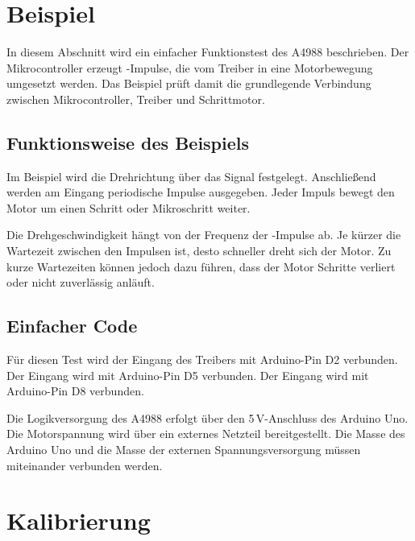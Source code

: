 \section{Beispiel}

In diesem Abschnitt wird ein einfacher Funktionstest des A4988 beschrieben. 
Der Mikrocontroller erzeugt -Impulse, die vom Treiber in eine Motorbewegung umgesetzt werden. 
Das Beispiel prüft damit die grundlegende Verbindung zwischen Mikrocontroller, Treiber und Schrittmotor.

\subsection{Funktionsweise des Beispiels}

Im Beispiel wird die Drehrichtung über das Signal  festgelegt. 
Anschließend werden am Eingang  periodische Impulse ausgegeben. 
Jeder Impuls bewegt den Motor um einen Schritt oder Mikroschritt weiter.

Die Drehgeschwindigkeit hängt von der Frequenz der -Impulse ab. 
Je kürzer die Wartezeit zwischen den Impulsen ist, desto schneller dreht sich der Motor. 
Zu kurze Wartezeiten können jedoch dazu führen, dass der Motor Schritte verliert oder nicht zuverlässig anläuft.

\subsection{Einfacher Code}

Für diesen Test wird der Eingang  des Treibers mit Arduino-Pin D2 verbunden. 
Der Eingang  wird mit Arduino-Pin D5 verbunden. 
Der Eingang  wird mit Arduino-Pin D8 verbunden.

Die Logikversorgung des A4988 erfolgt über den 5\,V-Anschluss des Arduino Uno. 
Die Motorspannung wird über ein externes Netzteil bereitgestellt. 
Die Masse des Arduino Uno und die Masse der externen Spannungsversorgung müssen miteinander verbunden werden.

\begin{code}[H]
	\label{Code:A4988SimpleStep}
\end{code}



\section{Kalibrierung}


